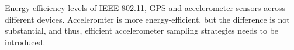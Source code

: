 Energy efficiency levels of IEEE 802.11, GPS and accelerometer sensors across different devices. Acceleromter is more energy-efficient, but the difference is not substantial, and thus, efficient accelerometer sampling strategies needs to be introduced.
